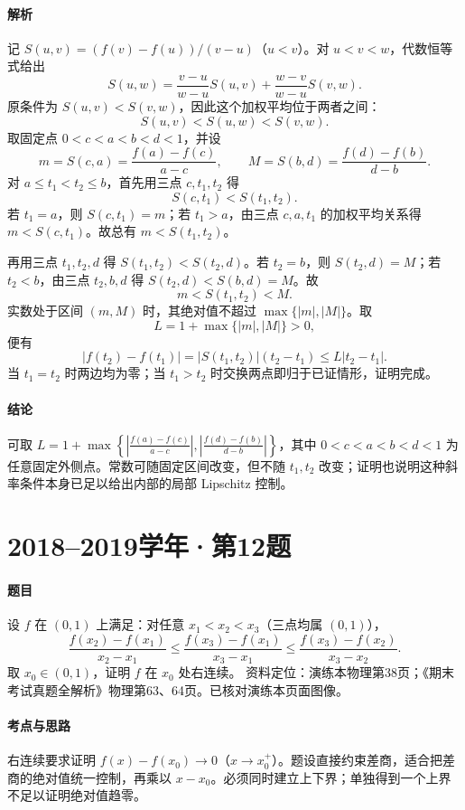 \documentclass[UTF8,fontset=fandol,12pt,oneside,openany]{ctexrep}
\theoremstyle{definition}
\begin{document}
\paragraph{解析}
记 $S(u,v)=(f(v)-f(u))/(v-u)$（$u<v$）。对 $u<v<w$，代数恒等式给出
\[
 S(u,w)=\frac{v-u}{w-u}S(u,v)+\frac{w-v}{w-u}S(v,w).
\]
原条件为 $S(u,v)<S(v,w)$，因此这个加权平均位于两者之间：
\[
 S(u,v)<S(u,w)<S(v,w).
\]
取固定点 $0<c<a<b<d<1$，并设
\[
 m=S(c,a)=\frac{f(a)-f(c)}{a-c},\qquad
 M=S(b,d)=\frac{f(d)-f(b)}{d-b}.
\]
对 $a\le t_1<t_2\le b$，首先用三点 $c,t_1,t_2$ 得
\[
 S(c,t_1)<S(t_1,t_2).
\]
若 $t_1=a$，则 $S(c,t_1)=m$；若 $t_1>a$，由三点 $c,a,t_1$ 的加权平均关系得 $m<S(c,t_1)$。故总有 $m<S(t_1,t_2)$。

再用三点 $t_1,t_2,d$ 得 $S(t_1,t_2)<S(t_2,d)$。若 $t_2=b$，则 $S(t_2,d)=M$；若 $t_2<b$，由三点 $t_2,b,d$ 得 $S(t_2,d)<S(b,d)=M$。故
\[
 m<S(t_1,t_2)<M.
\]
实数处于区间 $(m,M)$ 时，其绝对值不超过 $\max\{|m|,|M|\}$。取
\[
 L=1+\max\{|m|,|M|\}>0,
\]
便有
\[
 |f(t_2)-f(t_1)|
 =|S(t_1,t_2)|(t_2-t_1)\le L|t_2-t_1|.
\]
当 $t_1=t_2$ 时两边均为零；当 $t_1>t_2$ 时交换两点即归于已证情形，证明完成。

\paragraph{结论}
可取 $\displaystyle L=1+\max\left\{\left|\frac{f(a)-f(c)}{a-c}\right|,\left|\frac{f(d)-f(b)}{d-b}\right|\right\}$，其中 $0<c<a<b<d<1$ 为任意固定外侧点。常数可随固定区间改变，但不随 $t_1,t_2$ 改变；证明也说明这种斜率条件本身已足以给出内部的局部 Lipschitz 控制。

\par\addvspace{18pt}\noindent\begin{minipage}{\linewidth}
\section{2018--2019学年·第12题}
\paragraph{题目}
设 $f$ 在 $(0,1)$ 上满足：对任意 $x_1<x_2<x_3$（三点均属 $(0,1)$），
\[
 \frac{f(x_2)-f(x_1)}{x_2-x_1}
 \le\frac{f(x_3)-f(x_1)}{x_3-x_1}
 \le\frac{f(x_3)-f(x_2)}{x_3-x_2}.
\]
取 $x_0\in(0,1)$，证明 $f$ 在 $x_0$ 处右连续。
资料定位：演练本物理第38页；《期末考试真题全解析》物理第63、64页。已核对演练本页面图像。
\end{minipage}\par
\paragraph{考点与思路}
右连续要求证明 $f(x)-f(x_0)\to0$（$x\to x_0^+$）。题设直接约束差商，适合把差商的绝对值统一控制，再乘以 $x-x_0$。必须同时建立上下界；单独得到一个上界不足以证明绝对值趋零。
\end{document}

